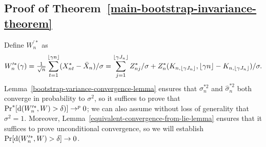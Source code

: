 \documentclass[11pt]{article}
\begin{document}
\subsection*{Proof of Theorem~\ref{main-bootstrap-invariance-theorem}}
\newcommand{\gn}{{\lfloor \gamma n \rfloor}}
\newcommand{\gJ}{{\lfloor \gamma J_n \rfloor}}
\newcommand{\lastK}{{K_{n, \gJ}}}
Define $W_n^{\prime*}$ as
\begin{equation*}
  W^{\prime*}_n(\gamma)
  = \tfrac{1}{\sqrt{n}} \sum_{t=1}^\gn (X_{nt}^* - \bar X_{n})/\sigma
  = \sum_{j=1}^\gJ \Zb /\sigma + Z_n^*(\lastK, \gn - \lastK) / \sigma.
\end{equation*}
Lemma~\ref{bootstrap-variance-convergence-lemma} ensures that
$\sigma_n^{*2}$ and $\hat\sigma_n^{*2}$ both converge in probability to
$\sigma^2$, so it suffices to prove that $\operatorname{Pr}^*[\operatorname{d}(W_n^{\prime*}, W) >
\delta)] \to^p 0$; we can also assume without loss of generality that
$\sigma^2 = 1$. Moreover,
Lemma~\ref{equivalent-convergence-from-lie-lemma} ensures that it
suffices to prove unconditional convergence, so we will establish
$\operatorname{Pr}[\operatorname{d}(W_n^{\prime *}, W) > \delta] \to 0$.
\end{document}
